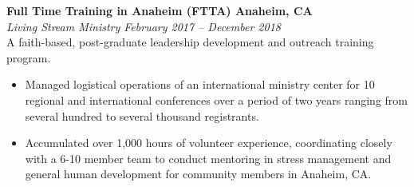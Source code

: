 \documentclass[letterpaper,6pt]{article}
\begin{document}
\vspace{3mm}
\textbf{Full Time Training in Anaheim (FTTA) \hfill Anaheim, CA} \\
\textit{Living Stream Ministry \hfill February 2017 -- December 2018} \\
A faith-based, post-graduate leadership development and outreach training program.
\vspace{1mm}
\begin{itemize}[itemsep=0.5mm,topsep=0pt]
    \item  Managed logistical operations of an international ministry center for 10 regional
        and international conferences over a period of two years ranging from several hundred to several thousand
        registrants.
\end{itemize}
\begin{itemize}[itemsep=0.5mm,topsep=0pt]
    \item  Accumulated over 1,000 hours of volunteer experience, coordinating closely with a 6-10 member team to conduct mentoring in stress management and general human development for community members in Anaheim, CA.
\end{itemize}
\end{document}
